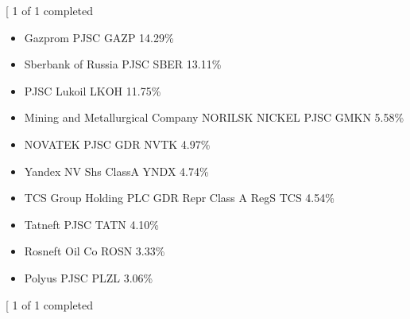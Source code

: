 \documentclass[letterpaper,10pt,english]{sphinxmanual}
\begin{document}
\noindent{}

\sphinxAtStartPar
{}

\sphinxAtStartPar
{}
\begin{sphinxalltt}
{[}\sphinxstylestrong{*******************100\%*********************}{]}  1 of 1 completed
\end{sphinxalltt}

\begin{sphinxVerbatim}[commandchars=\\\{\}]
\end{sphinxVerbatim}

\noindent{}

\sphinxAtStartPar
{}
\begin{itemize}
\item {} 
\sphinxAtStartPar
Gazprom PJSC GAZP 14.29\%

\item {} 
\sphinxAtStartPar
Sberbank of Russia PJSC SBER 13.11\%

\item {} 
\sphinxAtStartPar
PJSC Lukoil LKOH 11.75\%

\item {} 
\sphinxAtStartPar
Mining and Metallurgical Company NORILSK NICKEL PJSC GMKN 5.58\%

\item {} 
\sphinxAtStartPar
NOVATEK PJSC GDR NVTK 4.97\%

\item {} 
\sphinxAtStartPar
Yandex NV Shs Class\sphinxhyphen{}A\sphinxhyphen{} YNDX 4.74\%

\item {} 
\sphinxAtStartPar
TCS Group Holding PLC GDR Repr Class \sphinxhyphen{}A\sphinxhyphen{} Reg\sphinxhyphen{}S TCS 4.54\%

\item {} 
\sphinxAtStartPar
Tatneft PJSC TATN 4.10\%

\item {} 
\sphinxAtStartPar
Rosneft Oil Co ROSN 3.33\%

\item {} 
\sphinxAtStartPar
Polyus PJSC PLZL 3.06\%

\end{itemize}
\begin{sphinxalltt}
{[}\sphinxstylestrong{*******************100\%*********************}{]}  1 of 1 completed
\end{sphinxalltt}
\end{document}
